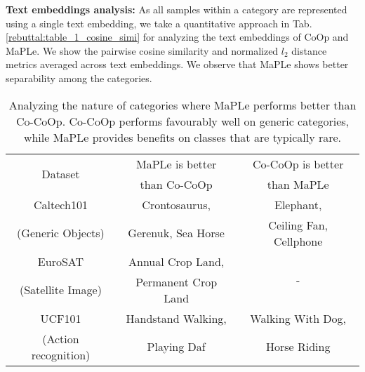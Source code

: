 \documentclass[10pt,twocolumn,letterpaper]{article}
\newcommand{\tablestyle}[2]{\setlength{\tabcolsep}{#1}\renewcommand{\arraystretch}{#2}\centering\footnotesize}
\begin{document}
\textbf{Text embeddings analysis:} As all samples within a category are represented using a single text embedding, we take a quantitative approach in Tab. \ref{rebuttal:table_1_cosine_simi} for analyzing the text embeddings of CoOp and MaPLe. We show the pairwise cosine similarity and normalized $l_{2}$ distance metrics averaged across text embeddings. We observe that MaPLe shows better separability among the categories.

\begin{table}[t]
\setlength{\tabcolsep}{3pt}
\centering
{}\hspace{-0.9em}
\caption{\small Avg. cosine similarity and $l_2$ distance of text embeddings. MaPLe shows better separability among the text categories.}
\label{rebuttal:table_1_cosine_simi}
\end{table}



\begin{table}[ht]
\tablestyle{8pt}{1.1}
\addtolength{\tabcolsep}{-3.7pt}
\centering
\begin{tabular}{ccc}
\toprule
\multirow{2}{*}{Dataset} & {MaPLe is better}  & {Co-CoOp is better} \\
  & {than  Co-CoOp}  & {than MaPLe} \\
\midrule
Caltech101 & Crontosaurus, & Elephant,\\
(Generic Objects) & Gerenuk, Sea Horse & Ceiling Fan, Cellphone \\
\midrule
EuroSAT & Annual Crop Land, & \multirow{2}{*}{-}\\
(Satellite Image) & Permanent Crop Land &		\\
\midrule
UCF101 & Handstand Walking, & Walking With Dog,\\
(Action recognition) & Playing Daf & Horse Riding	\\
\bottomrule
\end{tabular}
\caption{ 
Analyzing the nature of categories where MaPLe performs better than Co-CoOp. Co-CoOp performs favourably well on generic categories, while MaPLe provides benefits on classes that are typically rare.
} 
\label{table:class_category_analysis}
\end{table}
\end{document}
